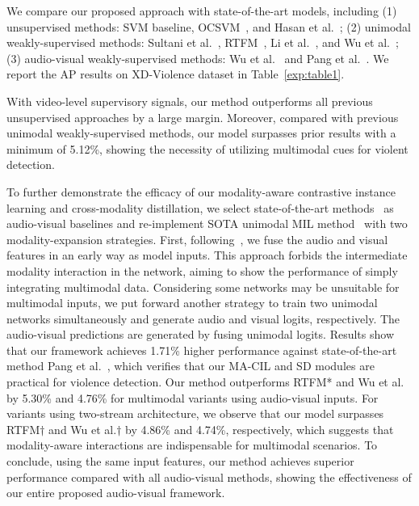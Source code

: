 \documentclass[sigconf]{acmart}
\begin{document}
We compare our proposed approach with state-of-the-art models, including (1) unsupervised methods: SVM baseline, OCSVM~\cite{scholkopf1999support}, and Hasan et al.~\cite{hasan2016learning}; (2) unimodal weakly-supervised methods: Sultani et al.~\cite{sultani2018real}, RTFM~\cite{tian2021weakly}, Li et al.~\cite{li2022self}, and Wu et al.~\cite{wu2021learning}; (3) audio-visual weakly-supervised methods: Wu et al.~\cite{wu2020not} and Pang et al.~\cite{pang2021violence}. We report the AP results on XD-Violence dataset in Table~\ref{exp:table1}. 

With video-level supervisory signals, our method outperforms all previous unsupervised approaches by a large margin. Moreover, compared with previous unimodal weakly-supervised methods, our model surpasses prior results with a minimum of 5.12\%, showing the necessity of utilizing multimodal cues for violent detection. 

To further demonstrate the efficacy of our modality-aware contrastive instance learning and cross-modality distillation, we select state-of-the-art methods~\cite{wu2020not, pang2021violence} as audio-visual baselines and re-implement SOTA unimodal MIL method~\cite{tian2021weakly} with two modality-expansion strategies. First, following~\cite{wu2020not}, we fuse the audio and visual features in an early way as model inputs. This approach forbids the intermediate modality interaction in the network, aiming to show the performance of simply integrating multimodal data. Considering some networks may be unsuitable for multimodal inputs, we put forward another strategy to train two unimodal networks simultaneously and generate audio and visual logits, respectively. The audio-visual predictions are generated by fusing unimodal logits. Results show that our framework achieves 1.71\% higher performance against state-of-the-art method Pang et al.~\cite{pang2021violence}, which verifies that our MA-CIL and SD modules are practical for violence detection. Our method outperforms RTFM* and Wu et al. by 5.30\% and 4.76\% for multimodal variants using audio-visual inputs. For variants using two-stream architecture, we observe that our model surpasses RTFM$\dagger$ and Wu et al.$\dagger$ by 4.86\% and 4.74\%, respectively, which suggests that modality-aware interactions are indispensable for multimodal scenarios. To conclude, using the same input features, our method achieves superior performance compared with all audio-visual methods, showing the effectiveness of our entire proposed audio-visual framework.
\end{document}
